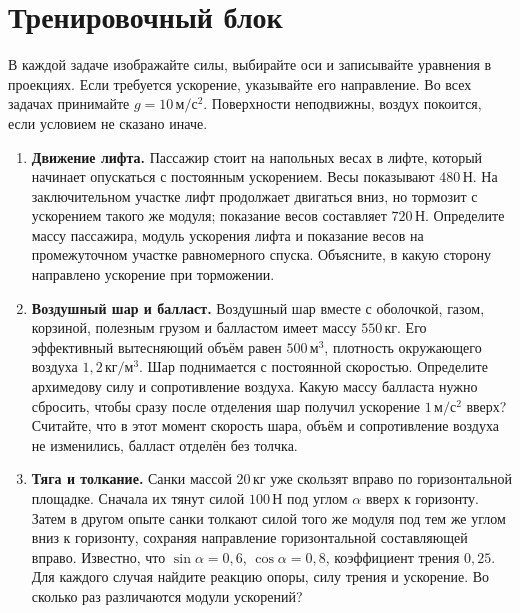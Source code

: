 \documentclass[a4paper,12pt]{article}
\newcommand{\unit}[1]{\,\text{#1}}
\newcommand{\acc}{\unit{м/с$^2$}}
\newcommand{\N}{\unit{Н}}
\newcommand{\kg}{\unit{кг}}
\begin{document}
\section*{Тренировочный блок}
В каждой задаче изображайте силы, выбирайте оси и записывайте уравнения в проекциях. Если требуется ускорение, указывайте его направление. Во всех задачах принимайте $g=10\acc$. Поверхности неподвижны, воздух покоится, если условием не сказано иначе.
\begin{enumerate}
\item \textbf{Движение лифта.} Пассажир стоит на напольных весах в лифте, который начинает опускаться с постоянным ускорением. Весы показывают $480\N$. На заключительном участке лифт продолжает двигаться вниз, но тормозит с ускорением такого же модуля; показание весов составляет $720\N$. Определите массу пассажира, модуль ускорения лифта и показание весов на промежуточном участке равномерного спуска. Объясните, в какую сторону направлено ускорение при торможении.
\item \textbf{Воздушный шар и балласт.} Воздушный шар вместе с оболочкой, газом, корзиной, полезным грузом и балластом имеет массу $550\kg$. Его эффективный вытесняющий объём равен $500\unit{м$^3$}$, плотность окружающего воздуха $1,2\unit{кг/м$^3$}$. Шар поднимается с постоянной скоростью. Определите архимедову силу и сопротивление воздуха. Какую массу балласта нужно сбросить, чтобы сразу после отделения шар получил ускорение $1\acc$ вверх? Считайте, что в этот момент скорость шара, объём и сопротивление воздуха не изменились, балласт отделён без толчка.
\item \textbf{Тяга и толкание.} Санки массой $20\kg$ уже скользят вправо по горизонтальной площадке. Сначала их тянут силой $100\N$ под углом $\alpha$ вверх к горизонту. Затем в другом опыте санки толкают силой того же модуля под тем же углом вниз к горизонту, сохраняя направление горизонтальной составляющей вправо. Известно, что $\sin\alpha=0,6$, $\cos\alpha=0,8$, коэффициент трения $0,25$. Для каждого случая найдите реакцию опоры, силу трения и ускорение. Во сколько раз различаются модули ускорений?
\end{enumerate}
\clearpage
\end{document}
